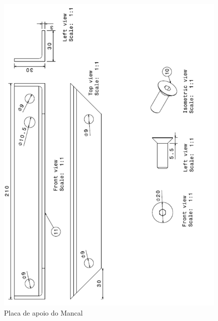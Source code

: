 \begin{anexosenv}
\begin{figure}[!ht]
	\centering
		\includegraphics[scale=0.6]{figuras/estrutura/anexos/14.png}
	\caption{Placa de apoio do Mancal}
\end{figure}


\end{anexosenv}
